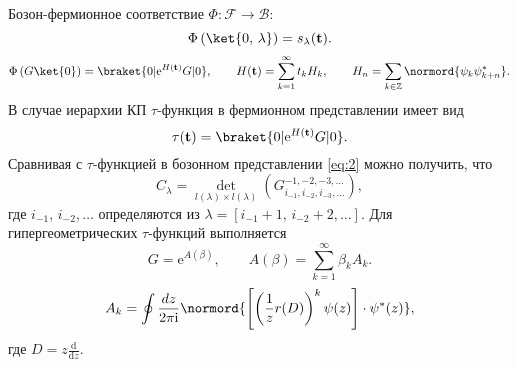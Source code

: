 \documentclass[a4paper, 14pt]{extarticle}
\begin{document}

Бозон-фермионное соответствие $\Phi: \mathcal{F} \to \mathcal{B}$:
\begin{equation}
	\Phi\left( \ket{0,\,\lambda} \right) =s_\lambda(\mathbf{t})
.\end{equation} 
\begin{equation}
	\Phi\left( G \ket{0} \right) = \braket{0 | \mathrm{e} ^{H(\mathbf{t})}G | 0},\qquad H(\mathbf{t})= \sum_{k=1}^{\infty} t_k H_k,\qquad
	H_n= \sum_{k \in \mathbb{Z}}^{} \normord{\psi_k \psi_{k+n}^{*}}
.\end{equation} 
В случае иерархии КП $\tau$-функция в фермионном представлении имеет вид
 \begin{equation}
	 \tau(\mathbf{t})= \braket{0 | \mathrm{e}^{H(\mathbf{t})}G | 0}
.\end{equation} 
Сравнивая с $\tau$-функцией в бозонном представлении \eqref{eq:2}
можно получить, что
\begin{equation}
	C_\lambda= \det_{l(\lambda)\times l(\lambda)}
	\left( G^{-1,-2,-3,\ldots}_{i_{-1},i_{-2},i_{-3},\ldots} \right) 
,\end{equation} 
где $i_{-1},\,i_{-2},\ldots$ определяются из $\lambda= \left[ i_{-1}+1,\,i_{-2}+2,\ldots \right] $.
Для гипергеометрических $\tau$-функций выполняется
\begin{equation}
	G=\mathrm{e} ^{A(\beta)},\qquad
	A(\beta)=\sum_{k=1}^{\infty} \beta_k A_k
.\end{equation} 
\begin{equation}
A_k= \oint \frac{dz}{2\pi \mathrm{i} } \normord{
\left[ \left( \frac{1}{z} r(D) \right) ^k \psi(z) \right] \cdot \psi^*(z)}
,\end{equation} 
где $D=z \frac{\mathrm{d} }{\mathrm{d} z}$.
\end{document}
